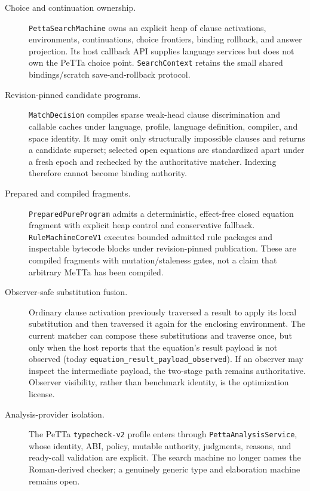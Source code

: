 \documentclass[11pt]{article}
\newcommand{\code}[1]{\texttt{#1}}
\newcommand{\PeTTa}{\textup{PeTTa}}
\begin{document}
\begin{description}
\item[Choice and continuation ownership.]
  \code{PettaSearchMachine} owns an explicit heap of clause activations,
  environments, continuations, choice frontiers, binding rollback, and answer
  projection.  Its host callback API supplies language services but does
  not own the \PeTTa{} choice point.  \code{SearchContext} retains the small
  shared bindings/scratch save-and-rollback protocol.
\item[Revision-pinned candidate programs.]
  \code{MatchDecision} compiles sparse weak-head clause discrimination and
  callable caches under language, profile, language definition, compiler, and space
  identity.  It may omit only structurally impossible clauses and returns a
  candidate superset; selected open equations are standardized apart under a
  fresh epoch and rechecked by the authoritative matcher.  Indexing therefore
  cannot become binding authority.
\item[Prepared and compiled fragments.]
  \code{PreparedPureProgram} admits a deterministic, effect-free closed
  equation fragment with explicit heap control and conservative fallback.
  \code{RuleMachineCoreV1} executes bounded admitted rule packages and
  inspectable bytecode blocks under revision-pinned publication.  These are
  compiled fragments with mutation/staleness gates, not a claim that arbitrary
  MeTTa has been compiled.
\item[Observer-safe substitution fusion.]
  Ordinary clause activation previously traversed a result to apply its local
  substitution and then traversed it again for the enclosing environment.
  The current matcher can compose these substitutions and traverse once, but
  only when the host reports that the equation's result payload is not
  observed (today \code{equation\_result\_payload\_observed}).  If an observer
  may inspect the intermediate payload, the two-stage path remains
  authoritative.  Observer visibility, rather than benchmark identity, is the
  optimization license.
\item[Analysis-provider isolation.]
  The \PeTTa{} \code{typecheck-v2} profile enters through
  \code{PettaAnalysisService}, whose identity, ABI, policy, mutable authority,
  judgments, reasons, and ready-call validation are explicit.  The search
  machine no longer names the Roman-derived checker; a genuinely generic type
  and elaboration machine remains open.
\end{description}
\end{document}

